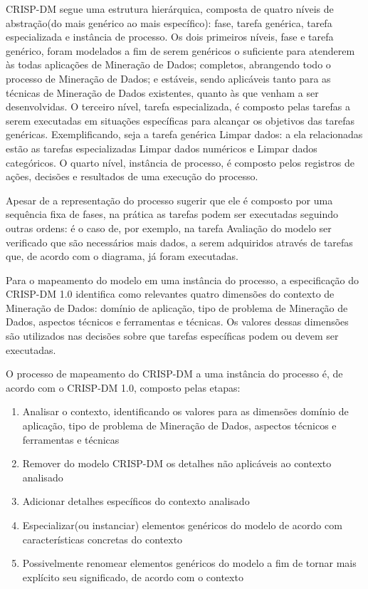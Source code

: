 CRISP-DM segue uma estrutura hierárquica, composta de quatro níveis de abstração(do mais genérico ao mais específico): fase, tarefa genérica, tarefa especializada e instância de processo. Os dois primeiros níveis, fase e tarefa genérico, foram modelados a fim de serem genéricos o suficiente para atenderem às todas aplicações de Mineração de Dados; completos, abrangendo todo o processo de Mineração de Dados; e estáveis, sendo aplicáveis tanto para as técnicas de Mineração de Dados existentes, quanto às que venham a ser desenvolvidas. O terceiro nível, tarefa especializada, é composto pelas tarefas a serem executadas em situações específicas para alcançar os objetivos das tarefas genéricas. Exemplificando, seja a tarefa genérica Limpar dados: a ela relacionadas estão as tarefas especializadas Limpar dados numéricos e Limpar dados categóricos. O quarto nível, instância de processo, é composto pelos registros de ações, decisões e resultados de uma execução do processo.\cite{CRISP-DM}

Apesar de a representação do processo sugerir que ele é composto por uma sequência fixa de fases, na prática as tarefas podem ser executadas seguindo outras ordens: é o caso de, por exemplo, na tarefa Avaliação do modelo ser verificado que são necessários mais dados, a serem adquiridos através de tarefas que, de acordo com o diagrama, já foram executadas.

Para o mapeamento do modelo em uma instância do processo, a especificação do CRISP-DM 1.0 identifica como relevantes quatro dimensões do contexto de Mineração de Dados: domínio de aplicação, tipo de problema de Mineração de Dados, aspectos técnicos e ferramentas e técnicas. Os valores dessas dimensões são utilizados nas decisões sobre que tarefas específicas podem ou devem ser executadas.

O processo de mapeamento do CRISP-DM a uma instância do processo é, de acordo com o CRISP-DM 1.0, composto pelas etapas:
\begin{enumerate}
\item Analisar o contexto, identificando os valores para as dimensões domínio de aplicação, tipo de problema de Mineração de Dados, aspectos técnicos e ferramentas e técnicas
\item Remover do modelo CRISP-DM os detalhes não aplicáveis ao contexto analisado
\item Adicionar detalhes específicos do contexto analisado
\item Especializar(ou instanciar) elementos genéricos do modelo de acordo com características concretas do contexto
\item Possivelmente renomear elementos genéricos do modelo a fim de tornar mais explícito seu significado, de acordo com o contexto
\end{enumerate}

